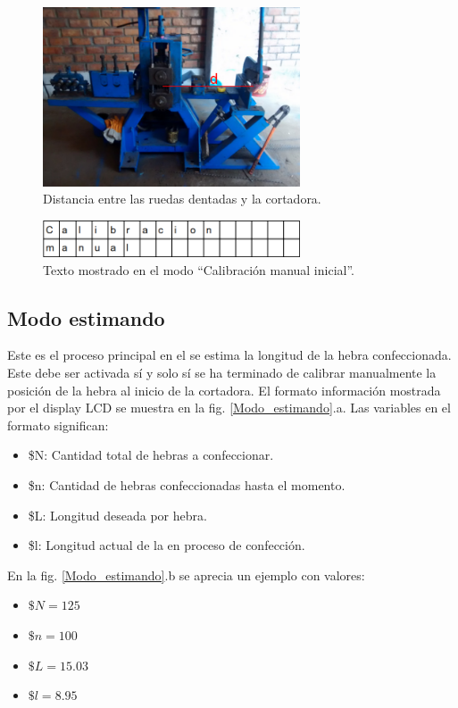 \documentclass[main_conf.tex]{subfiles}
\begin{document}
\begin{figure}[!t]
  \centering
  \includegraphics[width=3.0in]{../img/distancia_inicial.png}
  \caption{Distancia entre las ruedas dentadas y la cortadora.}
  \label{distancia_inicial}
\end{figure}

\begin{figure}[!t]
  \centering
  \includegraphics[width=3.0in]{../img/modo/Calibracion_manual_inicial.png}
  \caption{Texto mostrado en el modo “Calibración manual inicial”.}
  \label{Modo_Calibracion_manual_inicial}
\end{figure}

\subsection{Modo estimando}
Este es el proceso principal en el se estima la longitud de la hebra
confeccionada. Este debe ser activada sí y solo sí se ha terminado de
calibrar manualmente la posición de la hebra al inicio de la cortadora.
El formato información mostrada por el display LCD se muestra en la fig.
\ref{Modo_estimando}.a. Las variables en el formato significan:

\begin{itemize}
\item \$N: Cantidad total de hebras a confeccionar.
\item \$n: Cantidad de hebras confeccionadas hasta el momento.
\item \$L: Longitud deseada por hebra.
\item \$l: Longitud actual de la en proceso de confección.
\end{itemize}

En la fig. \ref{Modo_estimando}.b se aprecia un ejemplo con valores:
\begin{itemize}
\item $\$N = 125$
\item $\$n = 100$
\item $\$L = 15.03$
\item $\$l = 8.95$
\end{itemize}
\end{document}
